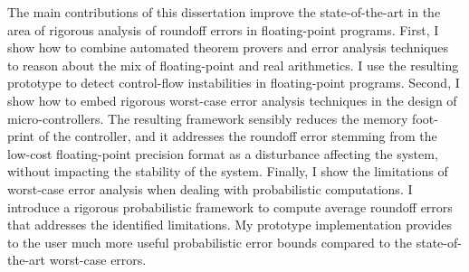 The main contributions of this dissertation improve the state-of-the-art in the area of rigorous analysis of roundoff errors in floating-point programs.
%
First, I show how to combine automated theorem provers and error analysis techniques to reason about the mix of floating-point and real arithmetics.
%
I use the resulting prototype to detect control-flow instabilities in floating-point programs.
%
Second, I show how to embed rigorous worst-case error analysis techniques in the design of micro-controllers.
%
%
The resulting framework sensibly reduces the memory foot-print of the controller, and it addresses the roundoff error stemming from the low-cost floating-point precision format as a disturbance affecting the system, without impacting the stability of the system.
%
Finally, I show the limitations of worst-case error analysis when dealing with probabilistic computations. 
%
I introduce a rigorous probabilistic framework to compute average roundoff errors that addresses the identified limitations.
%
My prototype implementation provides to the user much more useful probabilistic error bounds compared to the state-of-the-art worst-case errors.